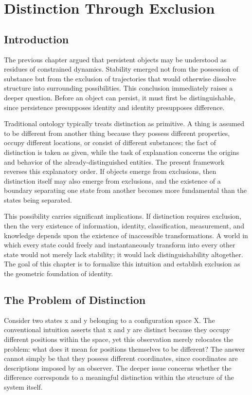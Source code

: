 \documentclass[11pt,oneside]{book}
\theoremstyle{plain}
\theoremstyle{definition}
\theoremstyle{remark}
\begin{document}
\chapter{Distinction Through Exclusion}

\section{Introduction}

The previous chapter argued that persistent objects may be understood as residues of constrained dynamics. Stability emerged not from the possession of substance but from the exclusion of trajectories that would otherwise dissolve structure into surrounding possibilities. This conclusion immediately raises a deeper question. Before an object can persist, it must first be distinguishable, since persistence presupposes identity and identity presupposes difference.

Traditional ontology typically treats distinction as primitive. A thing is assumed to be different from another thing because they possess different properties, occupy different locations, or consist of different substances; the fact of distinction is taken as given, while the task of explanation concerns the origins and behavior of the already-distinguished entities. The present framework reverses this explanatory order. If objects emerge from exclusions, then distinction itself may also emerge from exclusions, and the existence of a boundary separating one state from another becomes more fundamental than the states being separated.

This possibility carries significant implications. If distinction requires exclusion, then the very existence of information, identity, classification, measurement, and knowledge depends upon the existence of inaccessible transformations. A world in which every state could freely and instantaneously transform into every other state would not merely lack stability; it would lack distinguishability altogether. The goal of this chapter is to formalize this intuition and establish exclusion as the geometric foundation of identity.

\section{The Problem of Distinction}

Consider two states x and y belonging to a configuration space X. The conventional intuition asserts that x and y are distinct because they occupy different positions within the space, yet this observation merely relocates the problem: what does it mean for positions themselves to be different? The answer cannot simply be that they possess different coordinates, since coordinates are descriptions imposed by an observer. The deeper issue concerns whether the difference corresponds to a meaningful distinction within the structure of the system itself.
\end{document}
